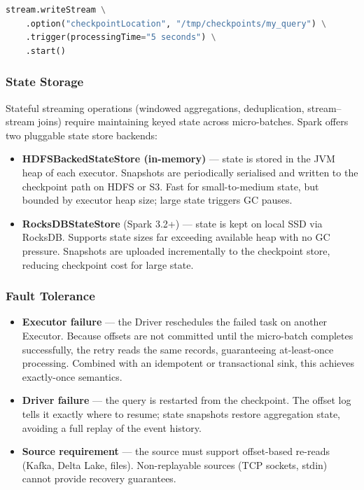 \begin{lstlisting}[language=Python, caption={Setting the checkpoint location in Spark.}]
stream.writeStream \
    .option("checkpointLocation", "/tmp/checkpoints/my_query") \
    .trigger(processingTime="5 seconds") \
    .start()
\end{lstlisting}

\subsubsection{State Storage}

Stateful streaming operations (windowed aggregations, deduplication, stream–stream joins)
require maintaining keyed state across micro-batches.
Spark offers two pluggable state store backends:

\begin{itemize}
  \item \textbf{HDFSBackedStateStore (in-memory)} — state is stored in the JVM heap of each executor.
        Snapshots are periodically serialised and written to the checkpoint path on HDFS or S3.
        Fast for small-to-medium state, but bounded by executor heap size; large state triggers GC pauses.
  \item \textbf{RocksDBStateStore} (Spark 3.2+) — state is kept on local SSD via RocksDB.
        Supports state sizes far exceeding available heap with no GC pressure.
        Snapshots are uploaded incrementally to the checkpoint store, reducing checkpoint cost for large state.
\end{itemize}

\subsubsection{Fault Tolerance}

\begin{itemize}
  \item \textbf{Executor failure} — the Driver reschedules the failed task on another Executor.
        Because offsets are not committed until the micro-batch completes successfully,
        the retry reads the same records, guaranteeing at-least-once processing.
        Combined with an idempotent or transactional sink, this achieves exactly-once semantics.
  \item \textbf{Driver failure} — the query is restarted from the checkpoint.
        The offset log tells it exactly where to resume; state snapshots restore aggregation state,
        avoiding a full replay of the event history.
  \item \textbf{Source requirement} — the source must support offset-based re-reads (Kafka, Delta Lake, files).
        Non-replayable sources (TCP sockets, stdin) cannot provide recovery guarantees.
\end{itemize}

